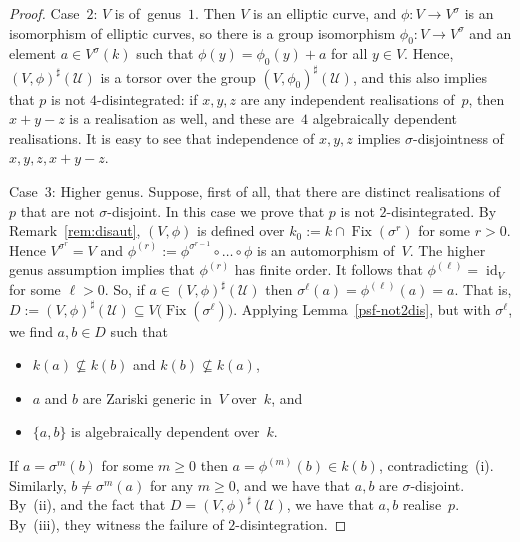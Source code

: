 \documentclass[\DocOpts]{amsart}
\theoremstyle{definition}
\def\fix{\operatorname{Fix}}
\def\U{\mathcal{U}}
\newcommand{\kk}{k}
\providecommand{\id}{\operatorname{id}}
\newcommand{\ra}[1][]{\xrightarrow{#1}}
\newcommand{\Set}[1]{\{#1\}}
\newcommand{\shp}[1]{{#1}^\sharp}
\newcommand{\<}{\langle}
\renewcommand{\>}{\rangle}
\newcommand{\pp}[1]{(#1)}
\begin{document}
\begin{proof}
		
				
Case~$2$: $V$ is of~genus~\(1\).
Then \(V\) is an elliptic curve, and 
		\(\phi:V\to{}V^\sigma\) is an isomorphism of elliptic curves, so there is 
		a group isomorphism \(\phi_0:V\ra{}V^\sigma\) and an element 
		\(a\in{}V^\sigma(k)\) such that \(\phi(y)=\phi_0(y)+a\) for all \(y\in{}V\).  
		Hence, \(\shp{\pp{V,\phi}}(\U)\) is a torsor over the group 
		\(\shp{\pp{V,\phi_0}}(\U)\), and this also implies that \(p\) is not \(4\)-disintegrated: if 
		\(x,y,z\) are any independent realisations of~\(p\), then \(x+y-z\) is a 
		realisation as well, and these are~\(4\) algebraically dependent 
		realisations.
		It is easy to see that independence of $x,y,z$ implies $\sigma$-disjointness of $x,y,z,x+y-z$.
		
Case~$3$: Higher genus.
Suppose, first of all, that there are distinct realisations of~$p$ that are not $\sigma$-disjoint.
In this case we prove that $p$ is not $2$-disintegrated.
By Remark~\ref{rem:disaut}, $(V,\phi)$ is defined over $k_0:=k\cap\fix(\sigma^r)$ for some $r>0$.
Hence $V^{\sigma^r}=V$ and \(\phi^{(r)}:=\phi^{\sigma^{r-1}}\circ\dots\circ\phi\) is an automorphism of~$V$.
The higher genus assumption implies that \(\phi^{(r)}\) has finite order.
It follows that $\phi^{(\ell)}=\id_V$ for some $\ell>0$.
So, if $a\in (V,\phi)^\sharp(\U)$ then $\sigma^\ell(a)=\phi^{(\ell)}(a)=a$.
That is, $D:=(V,\phi)^\sharp(\U)\subseteq V\big(\fix(\sigma^\ell)\big)$.
Applying Lemma~\ref{psf-not2dis}, but with $\sigma^\ell$, we find $a,b\in D$ such that
\begin{itemize}
\item[(i)]
 $k(a)\not\subseteq k(b)$ and $k(b)\not\subseteq k(a)$,
 \item[(ii)]
 $a$ and $b$ are Zariski generic in~\(V\) over~\(\kk\), and
 \item[(iii)]
 \(\Set{a,b}\) is algebraically dependent over~\(\kk\).
 \end{itemize}
 If $a=\sigma^m(b)$ for some $m\geq 0$ then $a=\phi^{(m)}(b)\in k(b)$, contradicting~(i).
 Similarly, $b\neq\sigma^m(a)$ for any $m\geq 0$, and we have that $a,b$ are $\sigma$-disjoint.
 By~(ii), and the fact that $D=(V,\phi)^\sharp(\U)$, we have that $a, b$ realise~$p$.
By~(iii), they witness the failure of $2$-disintegration.
				

\end{proof}
\end{document}
